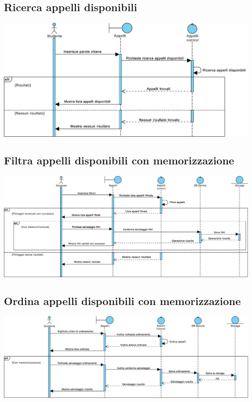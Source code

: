 \subsection{Ricerca appelli disponibili}
\begin{center}
	\includegraphics[width=6.5in]{imgs/gruppo1/sequence_diagrams/SD8_ricerca_appelli_disponibili.pdf}
\end{center}
\newpage


\subsection{Filtra appelli disponibili con memorizzazione}
\begin{center}
	\includegraphics[width=6.5in]{imgs/gruppo1/sequence_diagrams/SD9_filtra_appelli_disponibili_con_memorizzazione.pdf}
\end{center}
\subsection{Ordina appelli disponibili con memorizzazione}
\begin{center}
	\includegraphics[width=6.5in]{imgs/gruppo1/sequence_diagrams/SD10_ordina_appelli_disponibili_con_memorizzazione.pdf}
\end{center}
\newpage

